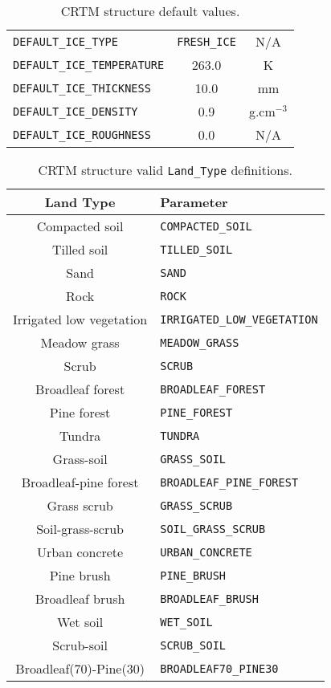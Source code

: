 \begin{table}[htp]
\begin{tabular}{l c c}
    \hline
    \texttt{DEFAULT\_ICE\_TYPE}               & \texttt{FRESH\_ICE} & N/A\\
    \texttt{DEFAULT\_ICE\_TEMPERATURE}        & 263.0      & K\\
    \texttt{DEFAULT\_ICE\_THICKNESS}          & 10.0       & mm\\
    \texttt{DEFAULT\_ICE\_DENSITY}            & 0.9        & g.cm$^{-3}$\\
    \texttt{DEFAULT\_ICE\_ROUGHNESS}          & 0.0        & N/A\\
    \hline
  \end{tabular}
  \caption{CRTM \Surface{} structure default values.}
  \label{tab:surface_default}
\end{table}

\begin{table}[htp]
  \centering
  \begin{tabular}{c l}
    \hline
    \sffamily\textbf{Land Type} & \sffamily\textbf{Parameter} \\
    \hline\hline
          Compacted soil      & \texttt{COMPACTED\_SOIL} \\
            Tilled soil       & \texttt{TILLED\_SOIL} \\
              Sand            & \texttt{SAND} \\
              Rock            & \texttt{ROCK} \\
     Irrigated low vegetation & \texttt{IRRIGATED\_LOW\_VEGETATION} \\
           Meadow grass       & \texttt{MEADOW\_GRASS} \\
              Scrub           & \texttt{SCRUB} \\
         Broadleaf forest     & \texttt{BROADLEAF\_FOREST} \\
           Pine forest        & \texttt{PINE\_FOREST} \\
             Tundra           & \texttt{TUNDRA} \\
           Grass-soil         & \texttt{GRASS\_SOIL} \\
       Broadleaf-pine forest  & \texttt{BROADLEAF\_PINE\_FOREST} \\
           Grass scrub        & \texttt{GRASS\_SCRUB} \\
         Soil-grass-scrub     & \texttt{SOIL\_GRASS\_SCRUB} \\
          Urban concrete      & \texttt{URBAN\_CONCRETE} \\
            Pine brush        & \texttt{PINE\_BRUSH} \\
          Broadleaf brush     & \texttt{BROADLEAF\_BRUSH} \\
             Wet soil         & \texttt{WET\_SOIL} \\
            Scrub-soil        & \texttt{SCRUB\_SOIL} \\
      Broadleaf(70)-Pine(30)  & \texttt{BROADLEAF70\_PINE30} \\
    \hline
  \end{tabular}
  \caption{CRTM \Surface{} structure valid \texttt{Land\_Type} definitions.}
  \label{tab:surface_land_type}
\end{table}

